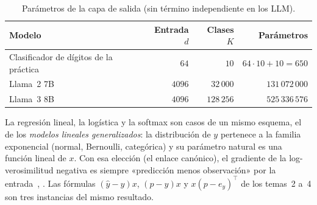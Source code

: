 \begin{table}[h]
\centering\small
\caption{Parámetros de la capa de salida (sin término independiente en los LLM).}\label{tab:cabezas}
\begin{tabular}{@{}lrrr@{}}
\toprule
Modelo & Entrada $d$ & Clases $K$ & Parámetros \\
\midrule
Clasificador de dígitos de la práctica & $64$ & $10$ & $64\cdot 10+10=650$ \\
Llama~2 7B~\cite{llama2} & $4096$ & $32\,000$ & $131\,072\,000$ \\
Llama~3 8B~\cite{llama3} & $4096$ & $128\,256$ & $525\,336\,576$ \\
\bottomrule
\end{tabular}
\end{table}

\begin{observacion}
La regresión lineal, la logística y la softmax son casos de un mismo esquema, el de los \emph{modelos lineales generalizados}: la distribución de $y$ pertenece a la familia exponencial (normal, Bernoulli, categórica) y su parámetro natural es una función lineal de $x$. Con esa elección (el enlace canónico), el gradiente de la log-verosimilitud negativa es siempre «predicción menos observación» por la entrada~\cite[cap.~3]{cs229}, \cite[§4.3.6]{bishop}. Las fórmulas $(\hat y-y)x$, $(p-y)x$ y $x(p-e_y)^{\top}$ de los temas~2 a~4 son tres instancias del mismo resultado.
\end{observacion}

